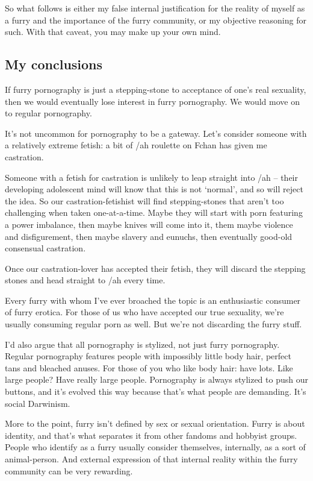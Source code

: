 So what follows is either my false internal justification for the reality of myself as a furry and the importance of the furry community, or my objective reasoning for such. With that caveat, you may make up your own mind.

\subsection*{My conclusions}

If furry pornography is just a stepping-stone to acceptance of one’s real sexuality, then we would eventually lose interest in furry pornography. We would move on to regular pornography.

It’s not uncommon for pornography to be a gateway. Let’s consider someone with a relatively extreme fetish: a bit of /ah roulette on Fchan has given me castration.

Someone with a fetish for castration is unlikely to leap straight into /ah -- their developing adolescent mind will know that this is not ‘normal’, and so will reject the idea. So our castration-fetishist will find stepping-stones that aren’t too challenging when taken one-at-a-time. Maybe they will start with porn featuring a power imbalance, then maybe knives will come into it, them maybe violence and disfigurement, then maybe slavery and eunuchs, then eventually good-old consensual castration.

Once our castration-lover has accepted their fetish, they will discard the stepping stones and head straight to /ah every time.

Every furry with whom I’ve ever broached the topic is an enthusiastic consumer of furry erotica. For those of us who have accepted our true sexuality, we’re usually consuming regular porn as well. But we’re not discarding the furry stuff.

I’d also argue that all pornography is stylized, not just furry pornography. Regular pornography features people with impossibly little body hair, perfect tans and bleached anuses. For those of you who like body hair: have lots. Like large people? Have really large people. Pornography is always stylized to push our buttons, and it’s evolved this way because that’s what people are demanding. It’s social Darwinism.

More to the point, furry isn’t defined by sex or sexual orientation. Furry is about identity, and that’s what separates it from other fandoms and hobbyist groups. People who identify as a furry usually consider themselves, internally, as a sort of animal-person. And external expression of that internal reality within the furry community can be very rewarding.

